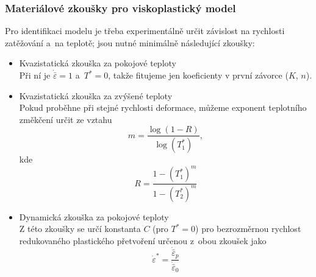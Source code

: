 \subsubsection{Materiálové zkoušky pro viskoplastický model}
Pro identifikaci modelu je třeba experimentálně určit závislost na rychlosti zatěžování a~na teplotě; jsou nutné minimálně následující zkoušky:
\begin{itemize}
	\item Kvazistatická zkouška za pokojové teploty\\
	Při ní je $\dot{\bar{\varepsilon}} = 1$ a~$T^* = 0$, takže fitujeme jen koeficienty v první závorce ($K$, $n$).
	\item Kvazistatická zkouška za zvýšené teploty\\
	Pokud proběhne při stejné rychlosti deformace, můžeme exponent 	teplotního změkčení určit ze vztahu
	\begin{equation}
		m = \frac{\log(1-R)}{\log(T^*_1)},
	\end{equation}
	kde
	\begin{equation*}
		R = \frac{1-(T^*_1)^m}{1-(T^*_2)^m}
	\end{equation*}
	\item Dynamická zkouška za pokojové teploty\\
	Z této zkoušky se určí konstanta $C$ (pro $T^* = 0$) pro bezrozměrnou rychlost redukovaného plastického přetvoření určenou z~obou zkoušek jako
	\begin{equation}
		\dot{\varepsilon}^* = \frac{\dot{\bar{\varepsilon}}_p}{\dot{\bar{\varepsilon}}_0}
	\end{equation}
\end{itemize}
